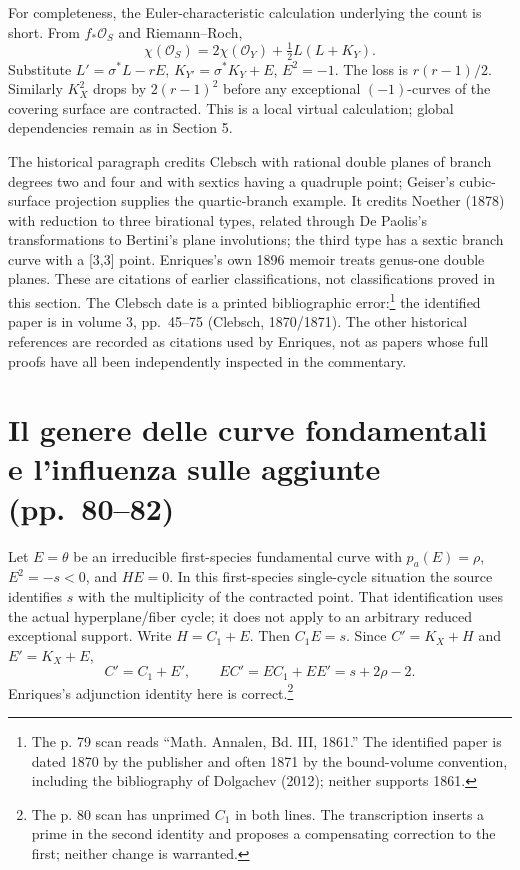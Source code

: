 For completeness, the Euler-characteristic calculation underlying the count is short. From \(f_*\mathcal O_S\) and Riemann--Roch, \[
\chi(\mathcal O_S)=2\chi(\mathcal O_Y)+\tfrac12 L(L+K_Y).
\] Substitute \(L'=\sigma^*L-rE\), \(K_{Y'}=\sigma^*K_Y+E\), \(E^2=-1\). The loss is \(r(r-1)/2\). Similarly \(K_X^2\) drops by \(2(r-1)^2\) before any exceptional \((-1)\)-curves of the covering surface are contracted. This is a local virtual calculation; global dependencies remain as in Section 5.

The historical paragraph credits Clebsch with rational double planes of branch degrees two and four and with sextics having a quadruple point; Geiser's cubic-surface projection supplies the quartic-branch example. It credits Noether (1878) with reduction to three birational types, related through De Paolis's transformations to Bertini's plane involutions; the third type has a sextic branch curve with a {[}3,3{]} point. Enriques's own 1896 memoir treats genus-one double planes. These are citations of earlier classifications, not classifications proved in this section. The Clebsch date is a printed bibliographic error:\footnote{The p. 79 scan reads ``Math. Annalen, Bd. III, 1861.'' The identified paper is dated 1870 by the publisher and often 1871 by the bound-volume convention, including the bibliography of Dolgachev (2012); neither supports 1861.} the identified paper is in volume 3, pp.~45--75 (Clebsch, 1870/1871). The other historical references are recorded as citations used by Enriques, not as papers whose full proofs have all been independently inspected in the commentary.

\section[Genere delle curve fondamentali]{Il genere delle curve fondamentali e l'influenza sulle aggiunte (pp.~80--82)}\label{commentary-III-9}

Let \(E=\theta\) be an irreducible first-species fundamental curve with \(p_a(E)=\rho\), \(E^2=-s<0\), and \(H E=0\). In this first-species single-cycle situation the source identifies \(s\) with the multiplicity of the contracted point. That identification uses the actual hyperplane/fiber cycle; it does not apply to an arbitrary reduced exceptional support. Write \(H=C_1+E\). Then \(C_1E=s\). Since \(C'=K_X+H\) and \(E'=K_X+E\), \[
C'=C_1+E',\qquad
E C'=E C_1+E E'=s+2\rho-2.
\] Enriques's adjunction identity here is correct.\footnote{The p. 80 scan has unprimed \(C_1\) in both lines. The transcription inserts a prime in the second identity and proposes a compensating correction to the first; neither change is warranted.}

